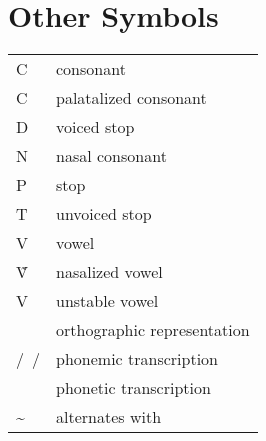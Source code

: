 \section*{Other Symbols}
\begin{longtabu} {YY[2.5]}
	C 		& consonant\\
	C	& palatalized consonant\\
	D 		& voiced stop\\
	N 		& nasal consonant\\
	P 		& stop\\
	T 		& unvoiced stop\\
	V		& vowel\\
	Ṽ	 	& nasalized vowel\\
	V& unstable vowel\\
	\orth{~}& orthographic representation\\
	/~/		& phonemic transcription\\
	\nt{ }	& phonetic transcription\\
	\sim	& alternates with\\
\end{longtabu}
